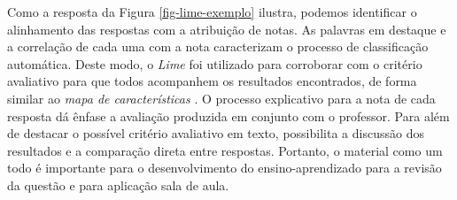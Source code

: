 Como a resposta da Figura \ref{fig-lime-exemplo} ilustra, podemos identificar o alinhamento das respostas com a atribuição de notas. As palavras em destaque e a correlação de cada uma com a nota caracterizam o processo de classificação automática. Deste modo, o \textit{Lime} foi utilizado para corroborar com o critério avaliativo para que todos acompanhem os resultados encontrados, de forma similar ao \textit{mapa de características} \cite{spalenza2016a}. O processo explicativo para a nota de cada resposta dá ênfase a avaliação produzida em conjunto com o professor. Para além de destacar o possível critério avaliativo em texto, possibilita a discussão dos resultados e a comparação direta entre respostas. Portanto, o material como um todo é importante para o desenvolvimento do ensino-aprendizado para a revisão da questão e para aplicação sala de aula.